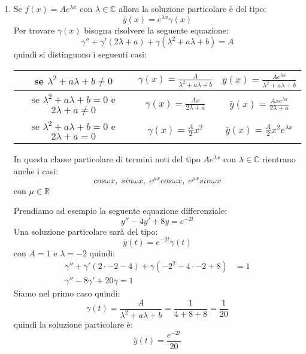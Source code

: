 \documentclass{article}
\begin{document}
\begin{enumerate}
\begin{enumerate}
    \item Se \( f(x) = Ae^{\lambda x} \) con \( \lambda \in \mathbb{C} \) allora
      la soluzione particolare è del tipo:
      \[
        \bar{y}(x) = e^{\lambda x} \gamma(x)
      \] 
      Per trovare \( \gamma (x) \) bisogna risolvere la seguente equazione:
      \[
        \gamma'' + \gamma'(2 \lambda + a) + \gamma(\lambda^2 + a \lambda + b) = A
      \] 
      quindi si distinguono i seguenti casi:
      \begin{table}[H]
        \centering
        \begin{tabular}{|c|c|c|}
          \hline
          se \( \lambda^2 + a \lambda + b \neq 0 \) & 
          \(\gamma (x) = \frac{A}{\lambda^2 + a \lambda + b} \) &
          \( \bar{y}(x) = \frac{A e^{\lambda x}}{\lambda^2 + a \lambda + b} \) \\
          \hline
          se \( \lambda^2 + a \lambda + b = 0 \) e \( 2 \lambda + a \neq 0 \) &
          \( \gamma (x) = \frac{A x}{2 \lambda + a} \) &
          \( \bar{y}(x) = \frac{A x e^{\lambda x}}{2 \lambda + a} \) \\
          \hline
          se \( \lambda^2 + a \lambda + b = 0 \) e \( 2 \lambda + a = 0 \) &
          \( \gamma (x) = \frac{A}{2}x^2 \) &
          \( \bar{y}(x) = \frac{A}{2} x^2 e^{\lambda x} \) \\
          \hline
        \end{tabular}
      \end{table}

      \noindent
      In questa classe particolare di termini noti del tipo \( A e^{\lambda x} \) con
      \( \lambda \in \mathbb{C} \) rientrano anche i casi:
      \[
        cos \omega x,\; sin \omega x,\; e^{\mu x} cos \omega x,\; e^{\mu x} sin \omega x
      \] 
      con \( \mu \in \mathbb{R} \) 

      \begin{example}
        Prendiamo ad esempio la seguente equazione differenziale:
        \[
          y'' -4y' +8y = e^{-2t}
        \] 
        Una soluzione particolare sarà del tipo:
        \[
          \bar{y}(t) = e^{-2t} \gamma(t)
        \] 
        con \( A = 1 \) e \( \lambda = -2 \) quindi:
        \[
          \begin{aligned}
            \gamma'' + \gamma'(2 \cdot -2 - 4) + \gamma (-2^2 - 4 \cdot -2 + 8) &= 1\\
            \gamma'' - 8 \gamma' + 20 \gamma = 1
          \end{aligned}
        \]
        Siamo nel primo caso quindi:
        \[
          \gamma(t) = \frac{A}{\lambda^2 + a \lambda + b} = \frac{1}{4 + 8 + 8} = \frac{1}{20}
        \]
        quindi la soluzione particolare è:
        \[
          \bar{y}(t) = \frac{e^{-2t}}{20}
        \] 
      \end{example}


\end{enumerate}
\end{enumerate}
\end{document}

